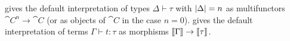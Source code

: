  gives the default interpretation of types $\Delta \vdash \tau$ with
$|\Delta| = n$ as multifunctors $\cat{C}^n \to \cat{C}$ (or as objects of $\cat{C}$ in the case $n =
0$).  gives the default interpretation of terms $\Gamma \vdash t: \tau$ as
morphisms $\llbracket \Gamma \rrbracket \to \llbracket \tau \rrbracket$.
